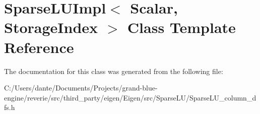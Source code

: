 \hypertarget{class_sparse_l_u_impl}{}\section{Sparse\+L\+U\+Impl$<$ Scalar, Storage\+Index $>$ Class Template Reference}
\label{class_sparse_l_u_impl}


The documentation for this class was generated from the following file\+:\begin{DoxyCompactItemize}
\item 
C\+:/\+Users/dante/\+Documents/\+Projects/grand-\/blue-\/engine/reverie/src/third\+\_\+party/eigen/\+Eigen/src/\+Sparse\+L\+U/Sparse\+L\+U\+\_\+column\+\_\+dfs.\+h\end{DoxyCompactItemize}
